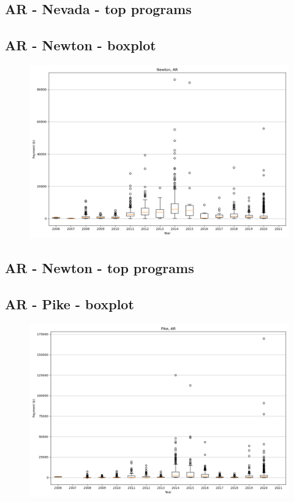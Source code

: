 \subsection*{AR - Nevada - top programs}

\newpage
\subsection*{AR - Newton - boxplot}
\begin{figure}[h]
\centering
\includegraphics[width=7in]{../output/boxplots/counties/Newton-AR_boxplot.png}
\end{figure}


\subsection*{AR - Newton - top programs}

\newpage
\subsection*{AR - Pike - boxplot}
\begin{figure}[h]
\centering
\includegraphics[width=7in]{../output/boxplots/counties/Pike-AR_boxplot.png}
\end{figure}


